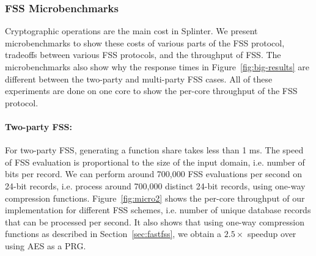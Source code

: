 
\subsubsection{FSS Microbenchmarks}
\label{sec:micro}
Cryptographic operations are the main
cost in Splinter.
We present microbenchmarks to show these costs of various
parts of the FSS protocol, 
tradeoffs between various FSS protocols,
and the throughput of FSS. The microbenchmarks
also show why the response times in Figure~\ref{fig:big-results} 
are different between the two-party and multi-party FSS cases.
All of these experiments are done on one core to show the 
per-core throughput of the FSS protocol.

\paragraph{Two-party FSS:}
For two-party FSS, generating a function share takes less than 1 ms.
The speed of FSS evaluation is proportional to the size of the input domain, i.e. number of bits per record. 
We can perform around 700,000 FSS evaluations per second on
24-bit records, i.e. process around 700,000
distinct 24-bit records, using one-way compression functions.
Figure~\ref{fig:micro2} shows the per-core throughput of our implementation
for different FSS schemes, i.e. number of unique database records that can be processed
per second. It also shows that using one-way compression functions
as described in Section~\ref{sec:fastfss}, we obtain a $2.5\times$ speedup over using 
AES as a PRG.

